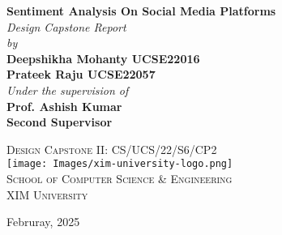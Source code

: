 
\begin{titlepage}
\vbox{ }
\vbox{ }
\begin{center}

{ \huge \bfseries Sentiment Analysis On Social Media Platforms}\\[2cm]
\textit{\large Design Capstone Report} \\
\vspace{0.2in}
\textit{\large by} \\
\vspace{0.2in}
\textbf{Deepshikha Mohanty UCSE22016 \\ Prateek Raju UCSE22057 } \\
\vspace{2cm}
\textit{\large Under the supervision of} \\
\vspace{0.2in}
\textbf{Prof. Ashish Kumar \\ Second Supervisor}
\vspace{2.5cm}

\textsc{\Large Design Capstone II: CS/UCS/22/S6/CP2}\\[3cm]

\texttt{[image: Images/xim-university-logo.png]}\\[0.5cm]
\textsc{\LARGE School of Computer Science \& Engineering}\\[0.5cm]
\textsc{\LARGE XIM University}\\[0.5cm]
\vbox{ }

{\large Februray, 2025}
\end{center}
\end{titlepage}